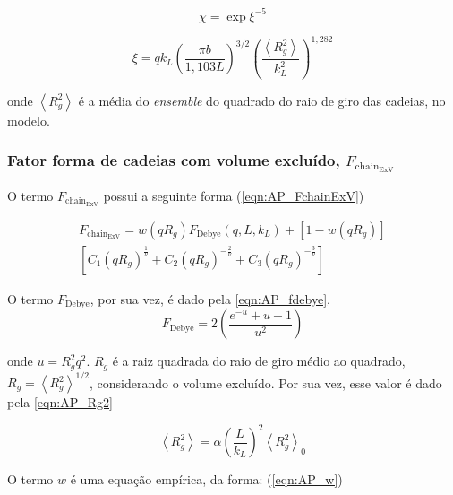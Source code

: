 \begin{apendicesenv}
\begin{equation}
\chi = \exp{\xi^{-5}}
\label{eqn:AP_chi}
\end{equation}

\begin{equation}
\xi = q k_L\left(\frac{\pi b}{1{,}103L}\right)^{3/2}\left(\frac{\left<R_g^2\right>}{k_L^2}\right)^{1{,}282}
\label{eqn:AP_xi}
\end{equation}

\noindent onde \(\left<R_g^2\right>\) é a média do \emph{ensemble} do quadrado do raio de giro das cadeias, no modelo.

\subsubsection{Fator forma de cadeias com volume excluído, \(F_{\mathrm{chain}_{\mathrm{ExV}}}\)}
\label{sec:F_chain_ExV_equacoes}
O termo \(F_{\mathrm{chain}_{\mathrm{ExV}}}\) possui a seguinte forma (\autoref{eqn:AP_FchainExV})

\begin{multline}
F_{\mathrm{chain}_{\mathrm{ExV}}} = w(qR_g)F_{\mathrm{Debye}}(q,L,k_L) + \left[1 - w(q R_g)\right] \\ \left[C_1(q R_g)^{\frac{1}{\nu}} + C_2(q R_g)^{-\frac{2}{\nu}} + 
C_3(q R_g)^{-\frac{3}{\nu}}\right]
\label{eqn:AP_FchainExV}
\end{multline}

O termo \(F_{\mathrm{Debye}}\), por sua vez, é dado pela \autoref{eqn:AP_fdebye}.
\begin{equation}
F_{\mathrm{Debye}} = 2 \left(\frac{e^{-u} + u - 1}{u^2}\right)
\label{eqn:AP_fdebye}
\end{equation}

\noindent onde \(u = R_g^2q^2\). \(R_g\) é a raiz quadrada do raio de giro médio ao quadrado, \(R_g = \left<R_g^2\right>^{1/2}\), considerando o volume excluído. Por sua vez, esse valor é dado pela \autoref{eqn:AP_Rg2}

\begin{equation}
\left<R_g^2\right> = \alpha \left(\frac{L}{k_L}\right)^2\left<R_g^2\right>_0
\label{eqn:AP_Rg2}
\end{equation}

O termo \(w\) é uma equação empírica, da forma: (\autoref{eqn:AP_w})


\end{apendicesenv}
